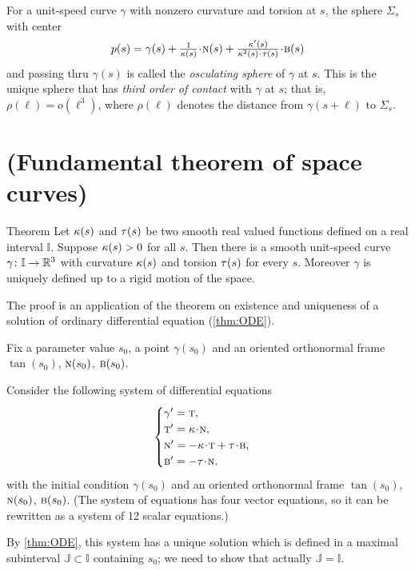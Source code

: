 For a unit-speed curve $\gamma$ with nonzero curvature and torsion at $s$,
the sphere $\Sigma_s$ with center
\[p(s)=\gamma(s)+\tfrac1{\kur(s)}\cdot \norm(s)+\tfrac{\kur'(s)}{\kur^2(s)\cdot\tor(s)}\cdot\bi(s)\]
and passing thru $\gamma(s)$ is called the \emph{osculating sphere} of $\gamma$ at $s$.
This is the unique sphere that has \emph{third order of contact} with $\gamma$ at $s$;
that is, $\rho(\ell)=o(\ell^3)$, where $\rho(\ell)$ denotes the distance from $\gamma(s+\ell)$ to $\Sigma_s$.
 
\section{(Fundamental theorem of space curves)}

\begin{thm}{Theorem}\label{thm:fund-curves}
Let $\kappa(s)$ and $\tau(s)$ be two smooth real valued functions defined on a real interval $\mathbb{I}$.
Suppose $\kappa(s)>0$ for all $s$.
Then there is a smooth unit-speed curve $\gamma\colon\mathbb{I}\to\mathbb{R}^3$ with curvature $\kappa(s)$ and torsion $\tau(s)$ for every $s$.
Moreover $\gamma$ is uniquely defined up to a rigid motion of the space.
\end{thm}

The proof is an application of the theorem on existence and uniqueness of a solution of ordinary differential equation (\ref{thm:ODE}).

Fix a parameter value $s_0$, a point $\gamma(s_0)$ and an oriented orthonormal frame $\tan(s_0)$, $\textsc{n}(s_0)$, $\textsc{b}(s_0)$.

Consider the following system of differential equations
\[
\begin{cases}
\gamma'=\tan,
\\
\tan'=\kur\cdot\norm,
\\
\norm'=-\kur\cdot\tan+\tor\cdot\bi,
\\
\bi'=-\tor\cdot\norm.
\end{cases}
\]
with the initial condition $\gamma(s_0)$ and an oriented orthonormal frame $\tan(s_0)$, $\textsc{n}(s_0)$, $\textsc{b}(s_0)$.
(The system of equations has four vector equations, so it can be rewritten as a system of 12 scalar equations.)

By \ref{thm:ODE}, this system has a unique solution which is defined in a maximal subinterval $\mathbb{J}\subset \mathbb{I}$ containing $s_0$; we need to show that actually $\mathbb{J}= \mathbb{I}$.

